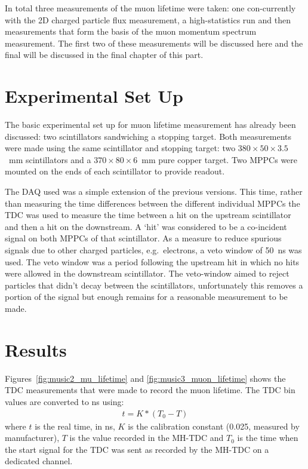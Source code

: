In total three measurements of the muon lifetime were taken: one con-currently with the 2D charged particle flux measurement, a high-statistics run and then measurements that form the basis of the muon momentum spectrum measurement. The first two of these measurements will be discussed here and the final will be discussed in the final chapter of this part.

\section{Experimental Set Up} %
\label{sec:experimental_set_up}
The basic experimental set up for muon lifetime measurement has already been discussed: two scintillators sandwiching a stopping target. Both measurements were made using the same scintillator and stopping target: two \( 380\times50\times3.5 \)~mm scintillators and a \( 370\times80\times6 \)~mm pure copper target. Two MPPCs were mounted on the ends of each scintillator to provide readout. 

The DAQ used was a simple extension of the previous versions. This time, rather than measuring the time differences between the different individual MPPCs the TDC was used to measure the time between a hit on the upstream scintillator and then a hit on the downstream. A `hit' was considered to be a co-incident signal on both MPPCs of that scintillator. As a measure to reduce spurious signals due to other charged particles, e.g.\ electrons, a veto window of 50~ns was used. The veto window was a period following the upstream hit in which no hits were allowed in the downstream scintillator. The veto-window aimed to reject particles that didn't decay between the scintillators, unfortunately this removes a portion of the signal but enough remains for a reasonable measurement to be made.

\section{Results} %
\label{sec:results} 
Figures~\ref{fig:music2_mu_lifetime} and \ref{fig:music3_muon_lifetime} shows the TDC measurements that were made to record the muon lifetime. The TDC bin values are converted to ns using:
\begin{align}
    t = K*(T_0-T)
\end{align}
where \( t \) is the real time, in ns, \( K \) is the calibration constant (0.025, measured by manufacturer), \( T \) is the value recorded in the MH-TDC and \( T_0 \) is the time when the start signal for the TDC was sent as recorded by the MH-TDC on a dedicated channel.

